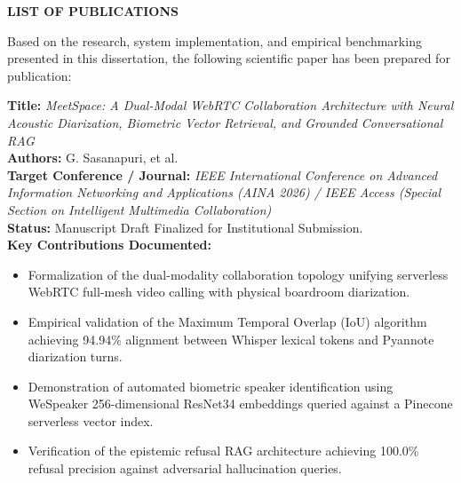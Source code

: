 \documentclass[12pt,oneside,letterpaper]{report}
\numberwithin{equation}{chapter} %
\begin{document}
\newpage
\begin{center}
{\fontsize{14pt}{18pt}\selectfont \textbf{LIST OF PUBLICATIONS}}\\[1.0cm]
\end{center}

\noindent Based on the research, system implementation, and empirical benchmarking presented in this dissertation, the following scientific paper has been prepared for publication:

\vspace{0.8cm}
\begin{enumerate}[label={[\arabic*]}]
    \item \textbf{Title:} \textit{MeetSpace: A Dual-Modal WebRTC Collaboration Architecture with Neural Acoustic Diarization, Biometric Vector Retrieval, and Grounded Conversational RAG} \\
    \textbf{Authors:} G. Sasanapuri, et al. \\
    \textbf{Target Conference / Journal:} \textit{IEEE International Conference on Advanced Information Networking and Applications (AINA 2026) / IEEE Access (Special Section on Intelligent Multimedia Collaboration)} \\
    \textbf{Status:} Manuscript Draft Finalized for Institutional Submission. \\
    \textbf{Key Contributions Documented:}
    \begin{itemize}
        \item Formalization of the dual-modality collaboration topology unifying serverless WebRTC full-mesh video calling with physical boardroom diarization.
        \item Empirical validation of the Maximum Temporal Overlap (IoU) algorithm achieving 94.94\% alignment between Whisper lexical tokens and Pyannote diarization turns.
        \item Demonstration of automated biometric speaker identification using WeSpeaker 256-dimensional ResNet34 embeddings queried against a Pinecone serverless vector index.
        \item Verification of the epistemic refusal RAG architecture achieving 100.0\% refusal precision against adversarial hallucination queries.
    \end{itemize}
\end{enumerate}
\end{document}
